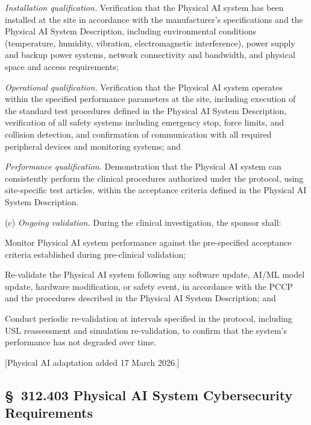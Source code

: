 \documentclass[11pt]{article}
\begin{document}
\begin{description}[leftmargin=0.8cm,style=sameline]
\item[(1)] \textit{Installation qualification.} Verification that the Physical AI system has been installed at the site in accordance with the manufacturer's specifications and the Physical AI System Description, including environmental conditions (temperature, humidity, vibration, electromagnetic interference), power supply and backup power systems, network connectivity and bandwidth, and physical space and access requirements;
\item[(2)] \textit{Operational qualification.} Verification that the Physical AI system operates within the specified performance parameters at the site, including execution of the standard test procedures defined in the Physical AI System Description, verification of all safety systems including emergency stop, force limits, and collision detection, and confirmation of communication with all required peripheral devices and monitoring systems; and
\item[(3)] \textit{Performance qualification.} Demonstration that the Physical AI system can consistently perform the clinical procedures authorized under the protocol, using site-specific test articles, within the acceptance criteria defined in the Physical AI System Description.
\end{description}

(c) \textit{Ongoing validation.} During the clinical investigation, the sponsor shall:

\begin{description}[leftmargin=0.8cm,style=sameline]
\item[(1)] Monitor Physical AI system performance against the pre-specified acceptance criteria established during pre-clinical validation;
\item[(2)] Re-validate the Physical AI system following any software update, AI/ML model update, hardware modification, or safety event, in accordance with the PCCP and the procedures described in the Physical AI System Description; and
\item[(3)] Conduct periodic re-validation at intervals specified in the protocol, including USL reassessment and simulation re-validation, to confirm that the system's performance has not degraded over time.
\end{description}

[Physical AI adaptation added 17 March 2026.]

\subsection{\S~312.403 Physical AI System Cybersecurity Requirements}
\end{document}
